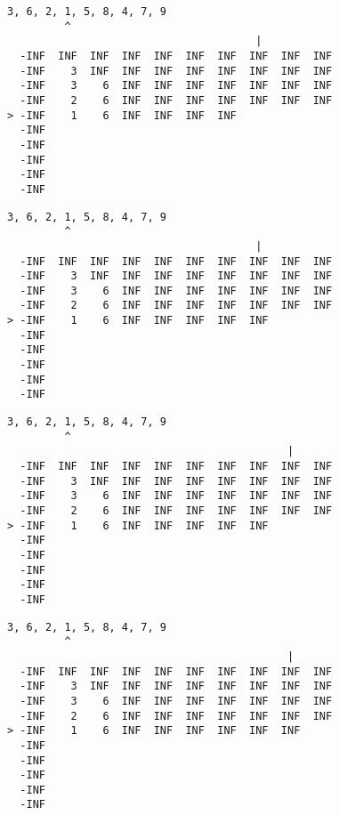 { \begin{verbatim}
3, 6, 2, 1, 5, 8, 4, 7, 9
         ^
                                       |
  -INF  INF  INF  INF  INF  INF  INF  INF  INF  INF
  -INF    3  INF  INF  INF  INF  INF  INF  INF  INF
  -INF    3    6  INF  INF  INF  INF  INF  INF  INF
  -INF    2    6  INF  INF  INF  INF  INF  INF  INF
> -INF    1    6  INF  INF  INF  INF               
  -INF                                             
  -INF                                             
  -INF                                             
  -INF                                             
  -INF                                             
\end{verbatim} }

{ \begin{verbatim}
3, 6, 2, 1, 5, 8, 4, 7, 9
         ^
                                       |
  -INF  INF  INF  INF  INF  INF  INF  INF  INF  INF
  -INF    3  INF  INF  INF  INF  INF  INF  INF  INF
  -INF    3    6  INF  INF  INF  INF  INF  INF  INF
  -INF    2    6  INF  INF  INF  INF  INF  INF  INF
> -INF    1    6  INF  INF  INF  INF  INF          
  -INF                                             
  -INF                                             
  -INF                                             
  -INF                                             
  -INF                                             
\end{verbatim} }

{ \begin{verbatim}
3, 6, 2, 1, 5, 8, 4, 7, 9
         ^
                                            |
  -INF  INF  INF  INF  INF  INF  INF  INF  INF  INF
  -INF    3  INF  INF  INF  INF  INF  INF  INF  INF
  -INF    3    6  INF  INF  INF  INF  INF  INF  INF
  -INF    2    6  INF  INF  INF  INF  INF  INF  INF
> -INF    1    6  INF  INF  INF  INF  INF          
  -INF                                             
  -INF                                             
  -INF                                             
  -INF                                             
  -INF                                             
\end{verbatim} }

{ \begin{verbatim}
3, 6, 2, 1, 5, 8, 4, 7, 9
         ^
                                            |
  -INF  INF  INF  INF  INF  INF  INF  INF  INF  INF
  -INF    3  INF  INF  INF  INF  INF  INF  INF  INF
  -INF    3    6  INF  INF  INF  INF  INF  INF  INF
  -INF    2    6  INF  INF  INF  INF  INF  INF  INF
> -INF    1    6  INF  INF  INF  INF  INF  INF     
  -INF                                             
  -INF                                             
  -INF                                             
  -INF                                             
  -INF                                             
\end{verbatim} }

